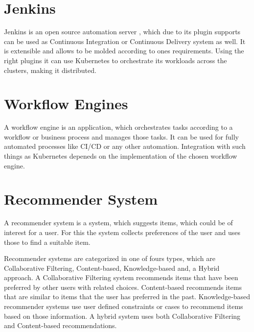 \section{Jenkins}
Jenkins is an open source automation server , which due to its plugin supports can be used as Continuous Integration or Continuous Delivery system as well. It is extensible and allows to be molded according to ones requirements. Using the right plugins it can use Kubernetes to orchestrate its workloads across the clusters, making it distributed.
\section{Workflow Engines}
A workflow engine is an application, which orchestrates tasks according to a workflow or business process and manages those tasks. It can be used for fully automated processes like CI/CD or any other automation. Integration with such things as Kubernetes depeneds on the implementation of the chosen workflow engine.

\section{Recommender System}
A recommender system is a system, which suggests items, which could be of interest for a user. For this the system collects preferences of the user and uses those to find a suitable item.

Recommender systems are categorized in one of fours types, which are Collaborative Filtering, Content-based, Knowledge-based and, a Hybrid approach.
A Collaborative Filtering system recommends items that have been preferred by other users with related choices.
Content-based recommends items that are similar to items that the user has preferred in the past.
Knowledge-based recommender systems use user defined constraints or cases to recommend items based on those information. 
A hybrid system uses both Collaborative Filtering and Content-based recommendations.
